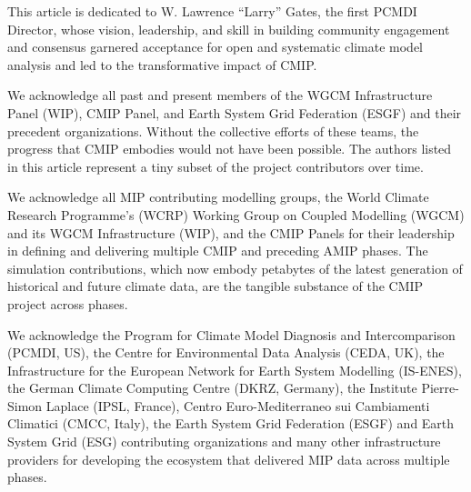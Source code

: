\documentclass[manuscript]{copernicus}
\begin{document}


\begin{acknowledgements}

This article is dedicated to W. Lawrence ``Larry'' Gates, the first PCMDI Director, whose vision, leadership, and skill in building community engagement and consensus garnered acceptance for open and systematic climate model analysis and led to the transformative impact of CMIP.

We acknowledge all past and present members of the WGCM Infrastructure Panel (WIP), CMIP Panel, and Earth System Grid Federation (ESGF) and their precedent organizations. Without the collective efforts of these teams, the progress that CMIP embodies would not have been possible. The authors listed in this article represent a tiny subset of the project contributors over time.

We acknowledge all MIP contributing modelling groups, the World Climate Research Programme's (WCRP) Working Group on Coupled Modelling (WGCM) and its WGCM Infrastructure (WIP), and the CMIP Panels for their leadership in defining and delivering multiple CMIP and preceding AMIP phases. The simulation contributions, which now embody petabytes of the latest generation of historical and future climate data, are the tangible substance of the CMIP project across phases.

We acknowledge the Program for Climate Model Diagnosis and Intercomparison (PCMDI, US), the Centre for Environmental Data Analysis (CEDA, UK), the Infrastructure for the European Network for Earth System Modelling (IS-ENES), the German Climate Computing Centre (DKRZ, Germany), the Institute Pierre-Simon Laplace (IPSL, France), Centro Euro-Mediterraneo sui Cambiamenti Climatici (CMCC, Italy), the Earth System Grid Federation (ESGF) and Earth System Grid (ESG) contributing organizations and many other infrastructure providers for developing the ecosystem that delivered MIP data across multiple phases.


\end{acknowledgements}
\end{document}
